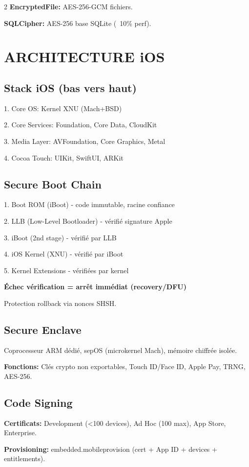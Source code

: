 \documentclass[9pt,a4paper]{extarticle}
\begin{document}
\begin{multicols}{2}
\textbf{EncryptedFile:} AES-256-GCM fichiers.

\textbf{SQLCipher:} AES-256 base SQLite (~10\% perf).

\section*{ARCHITECTURE iOS}

\subsection*{Stack iOS (bas vers haut)}
1. Core OS: Kernel XNU (Mach+BSD)

2. Core Services: Foundation, Core Data, CloudKit

3. Media Layer: AVFoundation, Core Graphics, Metal

4. Cocoa Touch: UIKit, SwiftUI, ARKit

\subsection*{Secure Boot Chain}
1. Boot ROM (iBoot) - code immutable, racine confiance

2. LLB (Low-Level Bootloader) - vérifié signature Apple

3. iBoot (2nd stage) - vérifié par LLB

4. iOS Kernel (XNU) - vérifié par iBoot

5. Kernel Extensions - vérifiées par kernel

\textbf{Échec vérification = arrêt immédiat (recovery/DFU)}

Protection rollback via nonces SHSH.

\subsection*{Secure Enclave}
Coprocesseur ARM dédié, sepOS (microkernel Mach), mémoire chiffrée isolée.

\textbf{Fonctions:} Clés crypto non exportables, Touch ID/Face ID, Apple Pay, TRNG, AES-256.

\subsection*{Code Signing}
\textbf{Certificats:} Development (<100 devices), Ad Hoc (100 max), App Store, Enterprise.

\textbf{Provisioning:} embedded.mobileprovision (cert + App ID + devices + entitlements).


\end{multicols}
\end{document}
